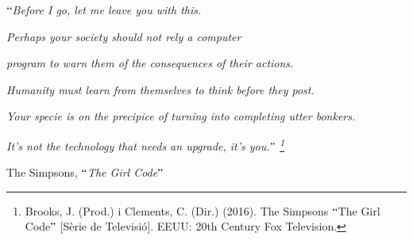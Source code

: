 \documentclass[12pt]{article}
\begin{document}
\vspace{\baselineskip}

\vspace{\baselineskip}

\vspace{\baselineskip}

\vspace{\baselineskip}
\begin{FlushRight}
\textit{$``$Before I go, let me leave you with this. }
\end{FlushRight}\par

\begin{FlushRight}
\textit{Perhaps your society should not rely a computer }
\end{FlushRight}\par

\begin{FlushRight}
\textit{program to warn them of the consequences of their actions.}
\end{FlushRight}\par

\begin{FlushRight}
\textit{ Humanity must learn from themselves to think before they post. }
\end{FlushRight}\par

\begin{FlushRight}
\textit{Your specie is on the precipice of turning into completing utter bonkers.}
\end{FlushRight}\par

\begin{FlushRight}
\textit{It’s not the technology that needs an upgrade, it’s you.$"$ \footnote{ Brooks, J. (Prod.) i Clements, C. (Dir.) (2016). The Simpsons $``$The Girl Code$"$  [Sèrie de Televisió]. EEUU: 20th Century Fox Television. }}
\end{FlushRight}\par


\vspace{\baselineskip}
\begin{FlushRight}
{\fontsize{11pt}{13.2pt}\selectfont The Simpsons, $``$\textit{The Girl Code$"$  }\par}
\end{FlushRight}\par


\vspace{\baselineskip}
\end{document}
